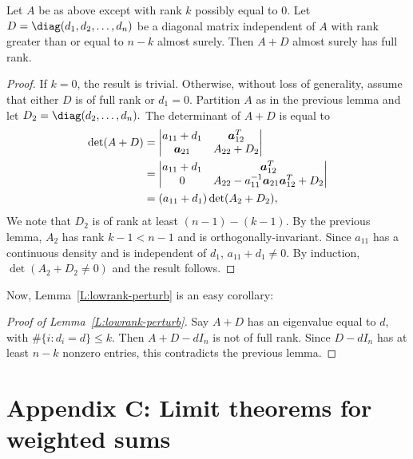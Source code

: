 \begin{lemma}
    Let $A$ be as above except with rank $k$ possibly equal to $0$.  
    Let $D = \diag(d_1, d_2, \ldots, d_n)$ be a diagonal matrix independent of
    $A$ with rank greater than or equal to $n-k$ almost surely.  Then
    $A + D$ almost surely has full rank.
\end{lemma}
\begin{proof}
    If $k = 0$, the result is trivial.  Otherwise,
    without loss of generality, assume that either $D$ is of full rank
    or $d_1 = 0$.  Partition $A$ as in the previous lemma and let 
    \(
        D_2 = \diag(d_2, \ldots, d_n).
    \)
    The determinant of $A + D$ is equal to
    \begin{align*}
        \det ( A + D )
            &= \left|
               \begin{matrix}
                   a_{11} + d_1 & \boldsymbol{a}_{12}^T \\
                   \boldsymbol{a}_{21}     & A_{22} + D_2
               \end{matrix}
               \right| \\
            &= \left|
               \begin{matrix}
                   a_{11} + d_1 & \boldsymbol{a}_{12}^T \\
                   0            & A_{22} - a_{11}^{-1} \boldsymbol{a}_{21} \boldsymbol{a}_{12}^T + D_2
               \end{matrix}
               \right| \\
            &= (a_{11} + d_1) \det (A_2 + D_2),
    \end{align*}
    We note that $D_2$ is of rank at least $(n-1) - (k-1)$. 
    By the previous lemma, $A_2$ has rank $k - 1 < n - 1$ and is
    orthogonally-invariant.  Since $a_{11}$ has a continuous density and
    is independent of $d_{1}$, $a_{11} + d_1 \neq 0$.  By induction,
    $\det (A_2 + D_2 \neq 0)$ and the result follows.
\end{proof}

Now, Lemma~\ref{L:lowrank-perturb} is an easy corollary:

\begin{proof}[Proof of Lemma~\ref{L:lowrank-perturb}]
    Say $A + D$ has an eigenvalue equal to $d$, with
    $\#\{ i : d_i = d \} \leq k$.  Then $A + D - d I_n$ is not
    of full rank.  Since $D - d I_n$ has at least $n-k$ nonzero entries,
    this contradicts the previous lemma.
\end{proof}    

\section*{Appendix C: Limit theorems for weighted sums}


